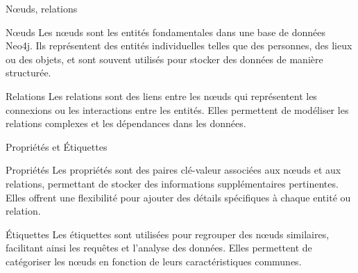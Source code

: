 \begin{frame}{Nœuds, relations}
  \begin{block}{Nœuds}
    Les nœuds sont les entités fondamentales dans une base de données Neo4j. Ils représentent des entités individuelles telles que des personnes, des lieux ou des objets, et sont souvent utilisés pour stocker des données de manière structurée.
  \end{block}
  \begin{block}{Relations}
    Les relations sont des liens entre les nœuds qui représentent les connexions ou les interactions entre les entités. Elles permettent de modéliser les relations complexes et les dépendances dans les données.
  \end{block}
\end{frame}

\begin{frame}{Propriétés et Étiquettes}
  \begin{block}{Propriétés}
    Les propriétés sont des paires clé-valeur associées aux nœuds et aux relations, permettant de stocker des informations supplémentaires pertinentes. Elles offrent une flexibilité pour ajouter des détails spécifiques à chaque entité ou relation.
  \end{block}
  \begin{block}{Étiquettes}
    Les étiquettes sont utilisées pour regrouper des nœuds similaires, facilitant ainsi les requêtes et l'analyse des données. Elles permettent de catégoriser les nœuds en fonction de leurs caractéristiques communes.
  \end{block}
\end{frame}
